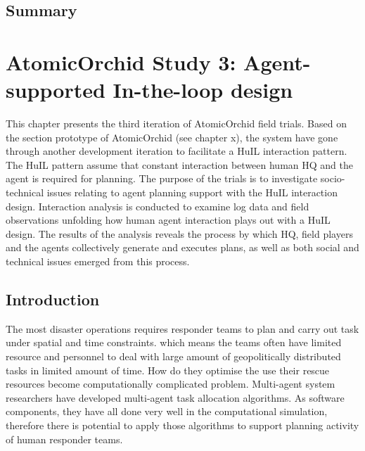 \section{Summary}










\chapter{AtomicOrchid Study 3: Agent-supported In-the-loop design}\label{ch:studythree} 
This chapter presents the third iteration of AtomicOrchid field trials. Based on the section prototype of AtomicOrchid (see chapter x), the system have gone through another development iteration to facilitate a HuIL interaction pattern. The HuIL pattern assume that constant interaction between human HQ and the  agent is required for planning. The purpose of the trials is to investigate socio-technical issues relating to agent planning support with the HuIL interaction design. Interaction analysis is conducted to examine log data and field observations unfolding how human agent interaction plays out with a HuIL design. The results of the analysis reveals the process by which HQ, field players and the agents collectively generate and executes plans, as well as  both social and technical issues emerged from this process.  \\


\section{Introduction}
The most disaster operations requires responder teams to plan and carry out task under spatial and time constraints. which means the teams often have limited resource and personnel to deal with large amount of geopolitically distributed tasks in limited amount of time. How do they optimise the use their rescue resources become computationally complicated problem. Multi-agent system researchers have developed multi-agent task allocation algorithms. As software components, they have all done very well in the computational simulation, therefore there is potential to apply those algorithms to support planning activity of human responder teams. \\


